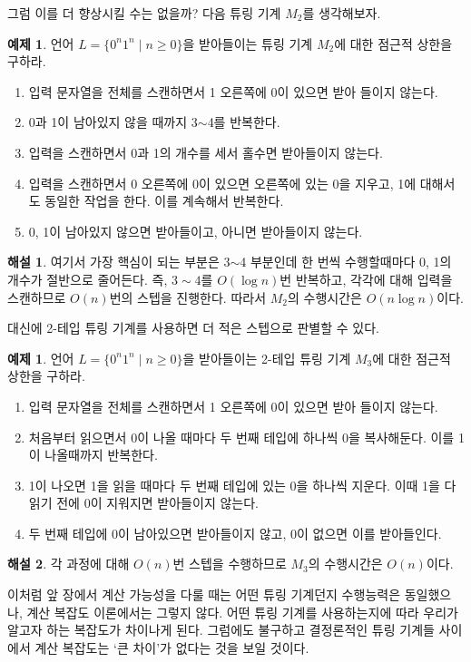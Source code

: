 \documentclass[b5paper, 11pt]{book}
\theoremstyle{definition}
\newtheorem{ex}[defn]{예제}
\newtheorem*{ans*}{해설}
\begin{document}
그럼 이를 더 향상시킬 수는 없을까? 다음 튜링 기계 $M_2$를 생각해보자. 
\begin{ex} \label{nlogn regular}
    언어 $L = \{0^n1^n \;\vert\; n \ge 0\}$을 받아들이는 튜링 기계 $M_2$에 대한 점근적 상한을 구하라. 
    \begin{enumerate}
        \item 입력 문자열을 전체를 스캔하면서 1 오른쪽에 0이 있으면 받아 들이지 않는다. 
        \item 0과 1이 남아있지 않을 때까지 3$\sim$4를 반복한다.
        \item 입력을 스캔하면서 0과 1의 개수를 세서 홀수면 받아들이지 않는다.
        \item 입력을 스캔하면서 0 오른쪽에 0이 있으면 오른쪽에 있는 0을 지우고, 1에 대해서도 동일한 작업을 한다. 이를 계속해서 반복한다.
        \item 0, 1이 남아있지 않으면 받아들이고, 아니면 받아들이지 않는다.
    \end{enumerate}
\end{ex}
\begin{ans*}
여기서 가장 핵심이 되는 부분은 3$\sim$4 부분인데 한 번씩 수행할때마다 0, 1의 개수가 절반으로 줄어든다. 즉, $3\sim 4$를 $O(\log{n})$번 반복하고, 각각에 대해 입력을 스캔하므로 $O(n)$번의 스텝을 진행한다. 따라서 $M_2$의 수행시간은 $O(n\log{n})$이다. 
\end{ans*} 
대신에 2-테입 튜링 기계를 사용하면 더 적은 스텝으로 판별할 수 있다. 
\begin{ex}
    언어 $L= \{0^n1^n \;\vert\; n \ge 0\}$을 받아들이는 2-테입 튜링 기계 $M_3$에 대한 점근적 상한을 구하라.
    \begin{enumerate}
        \item 입력 문자열을 전체를 스캔하면서 1 오른쪽에 0이 있으면 받아 들이지 않는다. 
        \item 처음부터 읽으면서 0이 나올 때마다 두 번째 테입에 하나씩 0을 복사해둔다.
        이를 1이 나올때까지 반복한다. 
        \item 1이 나오면 1을 읽을 때마다 두 번째 테입에 있는 0을 하나씩 지운다. 이때 1을 다 읽기 전에 0이 지워지면 받아들이지 않는다.
        \item 두 번째 테입에 0이 남아있으면 받아들이지 않고, 0이 없으면 이를 받아들인다. 
    \end{enumerate}
\end{ex}
\begin{ans*}
    각 과정에 대해 $O(n)$번 스텝을 수행하므로 $M_3$의 수행시간은 $O(n)$이다. 
\end{ans*}
이처럼 앞 장에서 계산 가능성을 다룰 때는 어떤 튜링 기계던지 수행능력은 동일했으나, 계산 복잡도 이론에서는 그렇지 않다. 어떤 튜링 기계를 사용하는지에 따라 우리가 알고자 하는 복잡도가 차이나게 된다. 그럼에도 불구하고 결정론적인 튜링 기계들 사이에서 계산 복잡도는 `큰 차이'가 없다는 것을 보일 것이다. 
\end{document}
